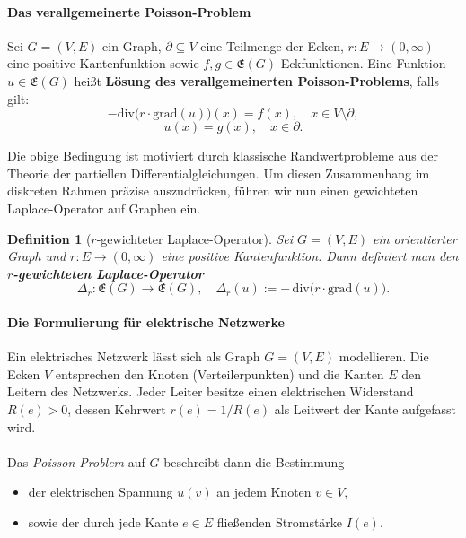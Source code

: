 \documentclass[11pt,a4paper,leqno]{report}
\newtheorem{definition}[theorem]{Definition}
\numberwithin{equation}{chapter}
\begin{document}
\paragraph{Das verallgemeinerte Poisson-Problem}
Sei $G=(V,E)$ ein Graph, $\partial \subseteq V$ eine Teilmenge der Ecken, 
$r:E \to (0,\infty)$ eine positive Kantenfunktion 
sowie $f,g\in \mathfrak{E}(G)$ Eckfunktionen. 
Eine Funktion $u\in \mathfrak{E}(G)$ heißt \textbf{Lösung des verallgemeinerten Poisson-Problems}, falls gilt:
\begin{equation}
	-\mathrm{div}\!\bigl(r \cdot \mathrm{grad}(u)\bigr)(x) = f(x), \quad x \in V\setminus\partial,
\end{equation}
\begin{equation}
	u(x) = g(x), \quad x \in \partial.
\end{equation}

Die obige Bedingung ist motiviert durch klassische Randwertprobleme 
aus der Theorie der partiellen Differentialgleichungen. 
Um diesen Zusammenhang im diskreten Rahmen präzise auszudrücken, 
führen wir nun einen gewichteten Laplace-Operator auf Graphen ein.
\begin{definition}[$r$-gewichteter Laplace-Operator]
	Sei $G=(V,E)$ ein orientierter Graph und 
	$r:E \to (0,\infty)$ eine positive Kantenfunktion. 
	Dann definiert man den \textbf{$r$-gewichteten Laplace-Operator}
	\[
	\Delta_r : \mathfrak{E}(G) \longrightarrow \mathfrak{E}(G), 
	\quad 
	\Delta_r(u) := -\,\mathrm{div}\!\bigl(r \cdot \mathrm{grad}(u)\bigr).
	\]
\end{definition}
\paragraph{Die Formulierung für elektrische Netzwerke}
Ein elektrisches Netzwerk lässt sich als Graph $G=(V,E)$ modellieren. 
Die Ecken $V$ entsprechen den Knoten (Verteilerpunkten) und die Kanten $E$ 
den Leitern des Netzwerks. Jeder Leiter besitze einen elektrischen Widerstand 
$R(e)>0$, dessen Kehrwert $r(e)=1/R(e)$ als Leitwert der Kante aufgefasst wird. \\ 
\\
Das \emph{Poisson-Problem} auf $G$ beschreibt dann die Bestimmung
\begin{itemize}
	\item der elektrischen Spannung $u(v)$ an jedem Knoten $v\in V$, 
	\item sowie der durch jede Kante $e\in E$ fließenden Stromstärke $I(e)$.
\end{itemize}
\end{document}
